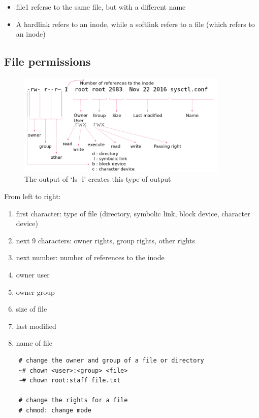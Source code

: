 \documentclass{article}
\begin{document}
\begin{itemize}
    \item file1 referse to the same file, but with a different name
    \item A hardlink refers to an inode, while a softlink refers to a file (which refers to an inode)
\end{itemize}

\subsection{File permissions}

\begin{figure}[H]
    \centering
    \includegraphics[width=0.9\textwidth]{file-permissions.png}
    \caption{The output of `ls -l' creates this type of output}
\end{figure}

From left to right:

\begin{enumerate}
    \item first character: type of file (directory, symbolic link, block device, character device)
    \item next 9 characters: owner rights, group rights, other rights
    \item next number: number of references to the inode
    \item owner user
    \item owner group
    \item size of file
    \item last modified
    \item name of file
\end{enumerate}

\begin{verbatim}
    # change the owner and group of a file or directory
    ~# chown <user>:<group> <file>
    ~# chown root:staff file.txt
    
    # change the rights for a file
    # chmod: change mode
\end{verbatim}
\end{document}
